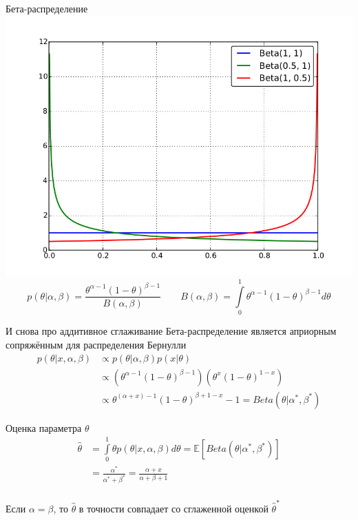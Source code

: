 \documentclass[10pt]{beamer}
\begin{document}
\begin{frame}{Бета-распределение}
  \centering
  \includegraphics[width=0.7 \textwidth, keepaspectratio]{images/Beta}
  $$p(\theta|\alpha, \beta) = \frac{\theta^{\alpha-1} (1-\theta)^{\beta-1}}{B(\alpha, \beta)} \qquad B(\alpha, \beta) = \int\limits_0^1 \theta^{\alpha-1} (1-\theta)^{\beta-1} d\theta$$
\end{frame}

\begin{frame}{И снова про аддитивное сглаживание}
  Бета-распределение является априорным сопряжённым для распределения Бернулли\\  
  \begin{equation*}
    \begin{split}
    p(\theta | x, \alpha, \beta) & \propto p(\theta|\alpha, \beta) p(x|\theta) \\
      & \propto (\theta^{\alpha-1} (1-\theta)^{\beta-1})(\theta^x (1-\theta)^{1-x}) \\
      & \propto \theta^{(\alpha+x)-1} (1-\theta)^{\beta+1-x}-1 = Beta(\theta| \alpha^*, \beta^*)
    \end{split}
  \end{equation*}
\end{frame}

\begin{frame}{Оценка параметра $\theta$}
  \begin{equation*}
    \begin{split}
      \hat{\theta} &= \int\limits_{0}^1 \theta p(\theta|x, \alpha, \beta) d\theta  = \mathbb{E} [Beta(\theta|\alpha^*, \beta^*)]\\
      & = \frac{\alpha^*}{\alpha^*+\beta^*} = \frac{\alpha+x}{\alpha + \beta + 1}
    \end{split}
  \end{equation*}\\
  Если $\alpha = \beta$, то $\hat{\theta}$ в точности совпадает со сглаженной оценкой $\hat{\theta}^*$  
\end{frame}
\end{document}

